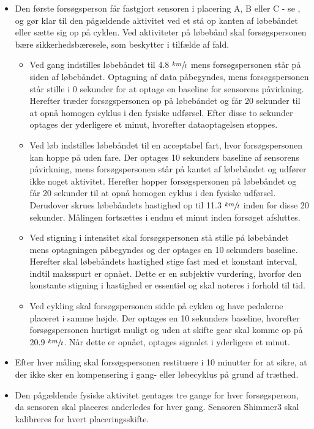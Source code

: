 \begin{itemize}
	\item Den første forsøgsperson får fastgjort sensoren i placering A, B eller C - se , og gør klar til den pågældende aktivitet ved et stå op kanten af løbebåndet eller sætte sig op på cyklen. Ved aktiviteter på løbebånd skal forsøgspersonen bære sikkerhedsbæresele, som beskytter i tilfælde af fald.
	\begin{itemize}
		\item Ved gang indstilles løbebåndet til 4.8 $\sfrac{km}{t}$ mens forsøgspersonen står på siden af løbebåndet. Optagning af data påbegyndes, mens forsøgspersonen står stille i 0 sekunder for at optage en baseline for sensorens påvirkning. Herefter træder forsøgspersonen op på løbebåndet og får 20 sekunder til at opnå homogen cyklus i den fysiske udførsel. Efter disse to sekunder optages der yderligere et minut, hvorefter dataoptagelsen stoppes.
		\item Ved løb indstilles løbebåndet til en acceptabel fart, hvor forsøgspersonen kan hoppe på uden fare. Der optages 10 sekunders baseline af sensorens påvirkning, mens forsøgspersonen står på kantet af løbebåndet og udfører ikke noget aktivitet. Herefter hopper forsøgspersonen på løbebåndet og får 20 sekunder til at opnå homogen cyklus i den fysiske udførsel. Derudover skrues løbebåndets hastighed op til 11.3 $\sfrac{km}{t}$ inden for disse 20 sekunder. Målingen fortsættes i endnu et minut inden forsøget afsluttes.
		\item Ved stigning i intensitet skal forsøgspersonen stå stille på løbebåndet mens optagningen påbegyndes og der optages en 10 sekunders baseline. Herefter skal løbebåndets hastighed stige fast med et konstant interval, indtil maksspurt er opnået. Dette er en subjektiv vurdering, hvorfor den konstante stigning i hastighed er essentiel og skal noteres i forhold til tid.
		\item Ved cykling skal forsøgspersonen sidde på cyklen og have pedalerne placeret i samme højde. Der optages en 10 sekunders baseline, hvorefter forsøgspersonen hurtigst muligt og uden at skifte gear skal komme op på 20.9 $\sfrac{km}{t}$. Når dette er opnået, optages signalet i yderligere et minut.
	\end{itemize}
	\item Efter hver måling skal forsøgspersonen restituere i 10 minutter for at sikre, at der ikke sker en kompensering i gang- eller løbecyklus på grund af træthed. %
	\item Den pågældende fysiske aktivitet gentages tre gange for hver forsøgsperson, da sensoren skal placeres anderledes for hver gang. Sensoren Shimmer3 skal kalibreres for hvert placeringsskifte.
\end{itemize}

